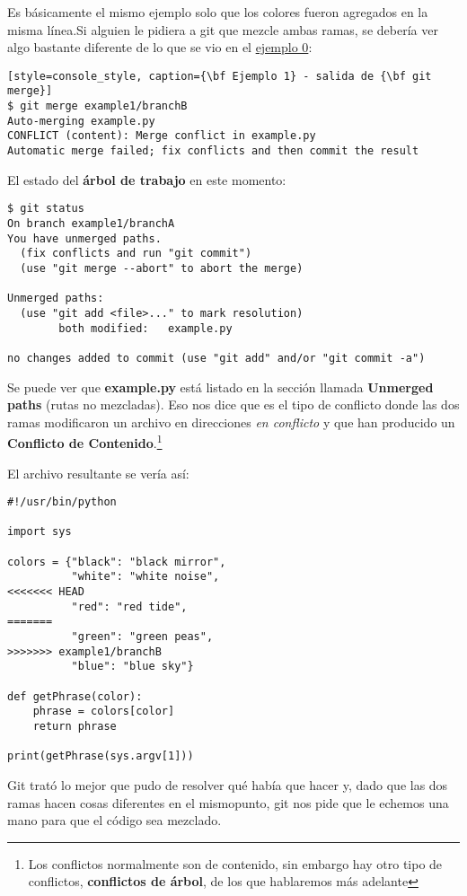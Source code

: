 Es básicamente el mismo ejemplo solo que los colores fueron agregados en la misma línea.Si alguien le pidiera a git
que mezcle ambas ramas, se debería ver algo bastante diferente de lo que se vio en el \hyperref[example_00]{ejemplo 0}:

\begin{lstlisting}[style=console_style, caption={\bf Ejemplo 1} - salida de {\bf git merge}]
$ git merge example1/branchB
Auto-merging example.py
CONFLICT (content): Merge conflict in example.py
Automatic merge failed; fix conflicts and then commit the result
\end{lstlisting}

El estado del {\bf árbol de trabajo} en este momento:
\begin{lstlisting}[style=console_style, caption={\bf Ejemplo 1} - git status]
$ git status
On branch example1/branchA
You have unmerged paths.
  (fix conflicts and run "git commit")
  (use "git merge --abort" to abort the merge)

Unmerged paths:
  (use "git add <file>..." to mark resolution)
        both modified:   example.py

no changes added to commit (use "git add" and/or "git commit -a")
\end{lstlisting}

Se puede ver que {\bf example.py} está listado en la sección llamada {\bf Unmerged paths} (rutas no mezcladas). Eso nos dice que
es el tipo de conflicto donde las dos ramas modificaron un archivo en direcciones {\it en conflicto} y que han producido un
{\bf Conflicto de Contenido}.\footnote{Los conflictos normalmente son de contenido, sin embargo hay otro tipo de conflictos,
{\bf conflictos de árbol}, de los que hablaremos más adelante}

El archivo resultante se vería así:
\begin{lstlisting}[style=python_style, caption={\bf Ejemplo 1} - archivo en conflicto]
#!/usr/bin/python

import sys

colors = {"black": "black mirror",
          "white": "white noise",
<<<<<<< HEAD
          "red": "red tide",
=======
          "green": "green peas",
>>>>>>> example1/branchB
          "blue": "blue sky"}

def getPhrase(color):
    phrase = colors[color]
    return phrase

print(getPhrase(sys.argv[1]))
\end{lstlisting}

Git trató lo mejor que pudo de resolver qué había que hacer y, dado que las dos ramas hacen cosas diferentes en el
mismopunto, git nos pide que le echemos una mano para que el código sea mezclado.

